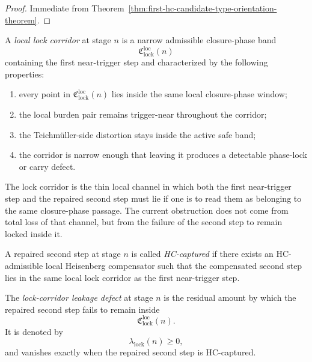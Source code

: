 \begin{proof}
Immediate from Theorem~\ref{thm:first-hc-candidate-type-orientation-theorem}.
\end{proof}


\begin{definition}
\label{def:local-lock-corridor}
A \emph{local lock corridor} at stage $n$ is a narrow admissible closure-phase band
\[
  \mathfrak C_{\mathrm{lock}}^{\mathrm{loc}}(n)
\]
containing the first near-trigger step and characterized by the following properties:
\begin{enumerate}[leftmargin=2em,label=(\alph*)]
  \item every point in $\mathfrak C_{\mathrm{lock}}^{\mathrm{loc}}(n)$ lies inside the same local closure-phase window;
  \item the local burden pair remains trigger-near throughout the corridor;
  \item the Teichm\"uller-side distortion stays inside the active safe band;
  \item the corridor is narrow enough that leaving it produces a detectable phase-lock or carry defect.
\end{enumerate}
\end{definition}

\begin{remark}
\label{rem:geometric-meaning-of-the-lock-corridor}
The lock corridor is the thin local channel in which both the first near-trigger step and the repaired second step must lie if one is to read them as belonging to the same closure-phase passage. The current obstruction does not come from total loss of that channel, but from the failure of the second step to remain locked inside it.
\end{remark}

\begin{definition}
\label{def:hc-captured-repaired-second-step}
A repaired second step at stage $n$ is called \emph{HC-captured} if there exists an HC-admissible local Heisenberg compensator such that the compensated second step lies in the same local lock corridor as the first near-trigger step.
\end{definition}

\begin{definition}
\label{def:lock-corridor-leakage-defect}
The \emph{lock-corridor leakage defect} at stage $n$ is the residual amount by which the repaired second step fails to remain inside
\[
  \mathfrak C_{\mathrm{lock}}^{\mathrm{loc}}(n).
\]
It is denoted by
\[
  \lambda_{\mathrm{lock}}(n)\ge 0,
\]
and vanishes exactly when the repaired second step is HC-captured.
\end{definition}


